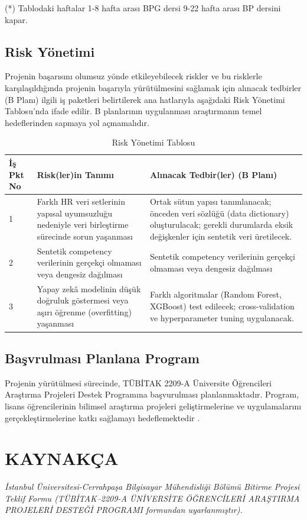 \documentclass[a4paper,12pt]{article}
\begin{document}
\noindent (*) Tablodaki haftalar 1-8 hafta arası BPG dersi 9-22 hafta arası BP dersini kapar.


\subsection*{Risk Yönetimi}
\noindent Projenin başarısını olumsuz yönde etkileyebilecek riskler ve bu risklerle karşılaşıldığında projenin başarıyla yürütülmesini sağlamak için alınacak tedbirler (B Planı) ilgili iş paketleri belirtilerek ana hatlarıyla aşağıdaki Risk Yönetimi Tablosu’nda ifade edilir. B planlarının uygulanması araştırmanın temel hedeflerinden sapmaya yol açmamalıdır.
	
\begin{table}[h!]
\centering
\renewcommand{\arraystretch}{1.3}
\setlength{\tabcolsep}{6pt}
\begin{tabular}{|p{1cm}|p{4cm}|p{9cm}|}
\hline
\textbf{İş Pkt No} & \textbf{Risk(ler)in Tanımı} & \textbf{Alınacak Tedbir(ler) (B Planı)}  \\
\hline
1 & Farklı HR veri setlerinin yapısal uyumsuzluğu nedeniyle veri birleştirme sürecinde sorun yaşanması &  Ortak sütun yapısı tanımlanacak; önceden veri sözlüğü (data dictionary) oluşturulacak; gerekli durumlarda eksik değişkenler için sentetik veri üretilecek.  \\
\hline
2 & Sentetik competency verilerinin gerçekçi olmaması veya dengesiz dağılması &  Sentetik competency verilerinin gerçekçi olmaması veya dengesiz dağılması \\
\hline
3 & Yapay zekâ modelinin düşük doğruluk göstermesi veya aşırı öğrenme (overfitting) yaşanması & Farklı algoritmalar (Random Forest, XGBoost) test edilecek; cross-validation ve hyperparameter tuning uygulanacak.   \\
\hline
\end{tabular}
\caption{Risk Yönetimi Tablosu }
\end{table}


\subsection*{Başvrulması Planlana Program}
\noindent Projenin yürütülmesi sürecinde, TÜBİTAK 2209-A Üniversite Öğrencileri Araştırma Projeleri Destek Programına başvurulması planlanmaktadır. Program, lisans öğrencilerinin bilimsel araştırma projeleri geliştirmelerine ve uygulamalarını gerçekleştirmelerine katkı sağlamayı hedeflemektedir \cite{tubitak2209a}.
\newpage
\section*{KAYNAKÇA}




\vspace{4cm}


\vfill
\noindent \textit{İstanbul Üniversitesi-Cerrahpaşa Bilgisayar Mühendisliği Bölümü Bitirme Projesi Teklif Formu (TÜBİTAK–2209-A ÜNİVERSİTE ÖĞRENCİLERİ ARAŞTIRMA PROJELERİ DESTEĞİ PROGRAMI formundan uyarlanmıştır).}
\end{document}
